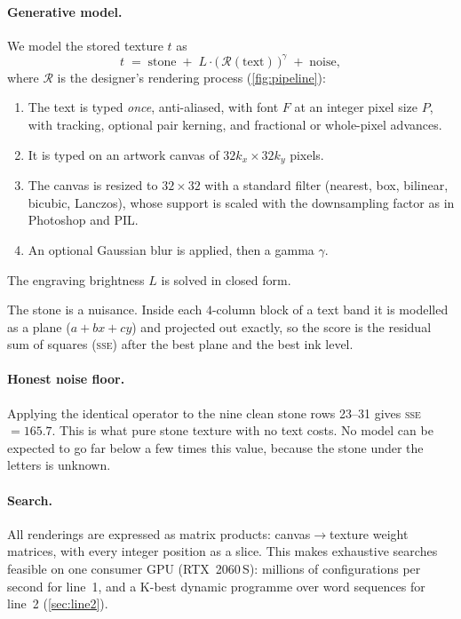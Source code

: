 \documentclass[10pt,a4paper]{article}
\newcommand{\SSE}{\textsc{sse}}
\begin{document}
\paragraph{Generative model.}
We model the stored texture $t$ as
\[ t \;=\; \text{stone} \;+\; L\cdot\big(\,\mathcal{R}(\text{text})\,\big)^{\gamma} \;+\; \text{noise}, \]
where $\mathcal{R}$ is the designer's rendering process (\cref{fig:pipeline}):
\begin{enumerate}
\item The text is typed \emph{once}, anti-aliased, with font $F$ at an integer pixel size $P$, with tracking, optional
pair kerning, and fractional or whole-pixel advances.
\item It is typed on an artwork canvas of $32k_x\times32k_y$ pixels.
\item The canvas is resized to $32\times32$ with a standard filter (nearest, box, bilinear, bicubic, Lanczos), whose
support is scaled with the downsampling factor as in Photoshop and PIL.
\item An optional Gaussian blur is applied, then a gamma $\gamma$.
\end{enumerate}
The engraving brightness $L$ is solved in closed form.

The stone is a nuisance. Inside each $4$-column block of a text band it is modelled as a plane ($a+bx+cy$) and projected
out exactly, so the score is the residual sum of squares (\SSE) after the best plane and the best ink level.

\paragraph{Honest noise floor.}
Applying the identical operator to the nine clean stone rows 23--31 gives \SSE{}~$=165.7$. This is what pure stone
texture with no text costs. No model can be expected to go far below a few times this value, because the stone under
the letters is unknown.

\paragraph{Search.}
All renderings are expressed as matrix products: canvas$\to$texture weight matrices, with every integer position as a
slice. This makes exhaustive searches feasible on one consumer GPU (RTX~2060\,S): millions of configurations per second
for line~1, and a K-best dynamic programme over word sequences for line~2 (\cref{sec:line2}).
\end{document}
